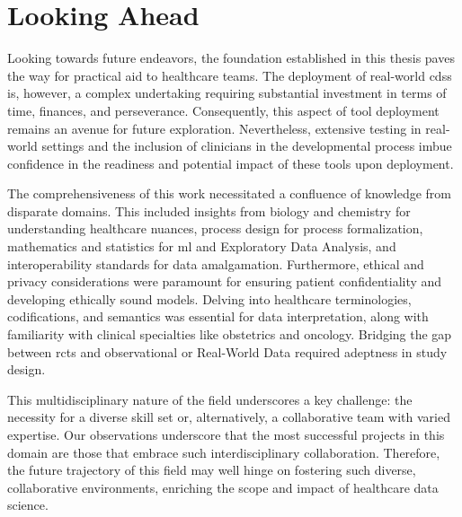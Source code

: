 \section{Looking Ahead}

Looking towards future endeavors, the foundation established in this thesis paves the way for practical aid to healthcare teams. The deployment of real-world \ac{cdss} is, however, a complex undertaking requiring substantial investment in terms of time, finances, and perseverance. Consequently, this aspect of tool deployment remains an avenue for future exploration. Nevertheless, extensive testing in real-world settings and the inclusion of clinicians in the developmental process imbue confidence in the readiness and potential impact of these tools upon deployment.


The comprehensiveness of this work necessitated a confluence of knowledge from disparate domains. This included insights from biology and chemistry for understanding healthcare nuances, process design for process formalization, mathematics and statistics for \ac{ml} and Exploratory Data Analysis, and interoperability standards for data amalgamation. Furthermore, ethical and privacy considerations were paramount for ensuring patient confidentiality and developing ethically sound models. Delving into healthcare terminologies, codifications, and semantics was essential for data interpretation, along with familiarity with clinical specialties like obstetrics and oncology. Bridging the gap between \acp{rct} and observational or Real-World Data required adeptness in study design.

This multidisciplinary nature of the field underscores a key challenge: the necessity for a diverse skill set or, alternatively, a collaborative team with varied expertise. Our observations underscore that the most successful projects in this domain are those that embrace such interdisciplinary collaboration. Therefore, the future trajectory of this field may well hinge on fostering such diverse, collaborative environments, enriching the scope and impact of healthcare data science.
